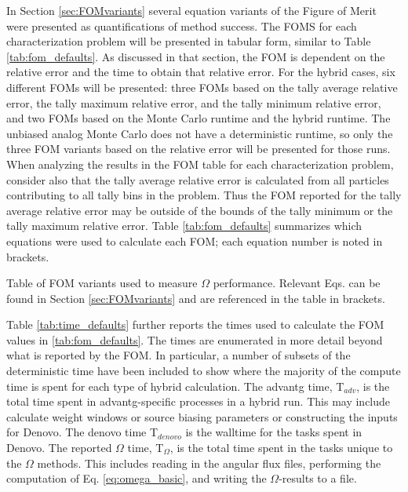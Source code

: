 In Section \ref{sec:FOMvariants} several equation variants of
the Figure of Merit were
presented as quantifications of method success. The FOMS for each
characterization problem will be presented in tabular form, similar to Table
\ref{tab:fom_defaults}. As discussed in that section, the FOM is dependent on
the relative error and the time to obtain that relative error. For the hybrid
cases, six different FOMs will be presented: three FOMs based on the tally average
relative error, the tally maximum relative error, and the tally minimum relative
error, and two FOMs based on the Monte Carlo runtime and the hybrid runtime. The
unbiased analog Monte Carlo does not have a deterministic runtime, so only the
three FOM variants based on the relative error will be presented for those runs.
When analyzing the results in the FOM table for each characterization problem,
consider also that the tally average relative error is calculated from all
particles contributing to all tally bins in the problem. Thus the FOM reported
for the tally average relative error may be outside of the bounds of the tally
minimum or the tally maximum relative error.
Table \ref{tab:fom_defaults} summarizes which
equations were used to calculate each FOM; each equation number is noted
in brackets.

\begin{table}[h!]
  \centering
  
  \caption[Table of FOM variants used to measure $\Omega$ performance.]{
  Table of FOM variants used to measure $\Omega$ performance. Relevant Eqs. can
  be found in Section \ref{sec:FOMvariants} and are referenced in the table in
  brackets.}
  \label{tab:fom_defaults}
\end{table}

Table \ref{tab:time_defaults} further reports the times used to calculate the
FOM values in \ref{tab:fom_defaults}. The times are enumerated in more detail
beyond what is reported by the FOM. In particular, a number of subsets of the
deterministic time have been included to show where the majority of the compute
time is spent for each type of hybrid calculation. The advantg time, T$_{adv}$,
is the total time spent in advantg-specific processes in a hybrid run. This may
include calculate weight windows or source biasing parameters or constructing
the inputs for Denovo. The denovo time T$_{denovo}$ is the walltime for the
tasks spent in Denovo. The reported $\Omega$ time, T$_{\Omega}$, is the total
time spent in the tasks unique to the $\Omega$ methods. This includes reading
in the angular flux files, performing the computation of Eq.
\eqref{eq:omega_basic}, and writing the $\Omega$-results to a file.

